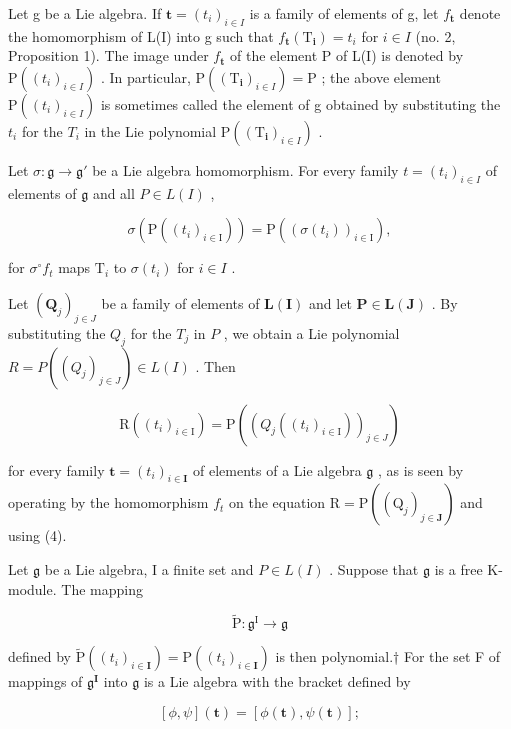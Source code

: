 Let g be a Lie algebra. If \(\boldsymbol{t} = (t_{i})_{i \in I}\) is a family of elements of g, let \(f_{\boldsymbol{t}}\) denote the homomorphism of L(I) into g such that \(f_{\boldsymbol{t}}(\mathrm{T}_{\boldsymbol{i}}) = t_{i}\) for \(i \in I\) (no. 2, Proposition 1). The image under \(f_{\boldsymbol{t}}\) of the element P of L(I) is denoted by \(\mathrm{P}((t_{i})_{i \in I})\) . In particular, \(\mathrm{P}((\mathrm{T}_{\boldsymbol{i}})_{i \in I}) = \mathrm{P}\) ; the above element \(\mathrm{P}((t_{i})_{i \in I})\) is sometimes called the element of g obtained by substituting the \(t_{i}\) for the \(T_{i}\) in the Lie polynomial \(\mathrm{P}((\mathrm{T}_{\boldsymbol{i}})_{i \in I})\) .

Let \(\sigma: \mathfrak{g} \to \mathfrak{g}'\) be a Lie algebra homomorphism. For every family \(t = (t_i)_{i \in I}\) of elements of \(\mathfrak{g}\) and all \(P \in L(I)\) ,

\[
\sigma (\mathrm{P} ((t _ {i}) _ {i \in \mathrm{I}})) = \mathrm{P} ((\sigma (t _ {i})) _ {i \in \mathrm{I}}),\tag{4}
\]

for \(\sigma^{\circ}f_{t}\) maps \(\mathrm{T}_i\) to \(\sigma(t_i)\) for \(i\in I\) .

Let \((\mathbf{Q}_j)_{j\in J}\) be a family of elements of \(\mathbf{L}(\mathbf{I})\) and let \(\mathbf{P}\in \mathbf{L}(\mathbf{J})\) . By substituting the \(Q_{j}\) for the \(T_{j}\) in \(P\) , we obtain a Lie polynomial \(R = P((Q_{j})_{j \in J}) \in L(I)\) . Then

\[
\mathrm{R} ((t _ {i}) _ {i \in \mathrm{I}}) = \mathrm{P} ((Q _ {j} ((t _ {i}) _ {i \in \mathrm{I}})) _ {j \in J})\tag{5}
\]

for every family \(\pmb{t} = (t_i)_{i\in \mathbf{I}}\) of elements of a Lie algebra \(\mathfrak{g}\) , as is seen by operating by the homomorphism \(f_{t}\) on the equation \(\mathrm{R} = \mathrm{P}((\mathrm{Q}_j)_{j\in \mathbf{J}})\) and using (4).

Let \(\mathfrak{g}\) be a Lie algebra, I a finite set and \(P \in L(I)\) . Suppose that \(\mathfrak{g}\) is a free K-module. The mapping

\[
\tilde {\mathrm{P}} \colon \mathfrak {g} ^ {\mathrm{I}} \to \mathfrak {g}
\]

defined by \(\tilde{\mathrm{P}}((t_i)_{i\in \mathbf{I}}) = \mathrm{P}((t_i)_{i\in \mathbf{I}})\) is then polynomial.† For the set F of mappings of \(\mathfrak{g}^{\mathbf{I}}\) into \(\mathfrak{g}\) is a Lie algebra with the bracket defined by

\[
[ \phi , \psi ] (\boldsymbol {t}) = [ \phi (\boldsymbol {t}), \psi (\boldsymbol {t}) ];\tag{6}
\]

